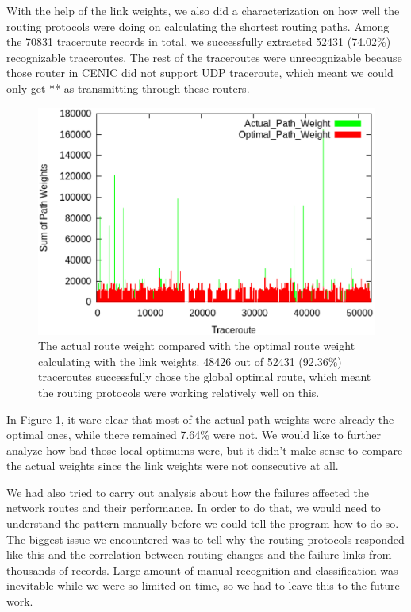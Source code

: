 \documentclass[conference, twocolumn, oneside, 10pt]{IEEEtran}
\begin{document}
With the help of the link weights, we also did a characterization on how well the routing protocols were doing on calculating the shortest routing paths. Among the 70831 traceroute records in total, we successfully extracted 52431 (74.02\%) recognizable traceroutes. The rest of the traceroutes were unrecognizable because those router in CENIC did not support UDP traceroute, which meant we could only get ** as transmitting through these routers.

\begin{figure}[h!]
\centering
\includegraphics[scale=0.4]{plot/routing_performance.eps}
\caption{The actual route weight compared with the optimal route weight calculating with the link weights. 48426 out of 52431 (92.36\%) traceroutes successfully chose the global optimal route, which meant the routing protocols were working relatively well on this.}
\label{fig:routingperformance}
\end{figure}

In Figure \ref{fig:routingperformance}, it ware clear that most of the actual path weights were already the optimal ones, while there remained 7.64\% were not. We would like to further analyze how bad those local optimums were, but it didn't make sense to compare the actual weights since the link weights were not consecutive at all.

We had also tried to carry out analysis about how the failures affected the network routes and their performance. In order to do that, we would need to understand the pattern manually before we could tell the program how to do so. The biggest issue we encountered was to tell why the routing protocols responded like this and the correlation between routing changes and the failure links from thousands of records. Large amount of manual recognition and classification was inevitable while we were so limited on time, so we had to leave this to the future work.
\end{document}
